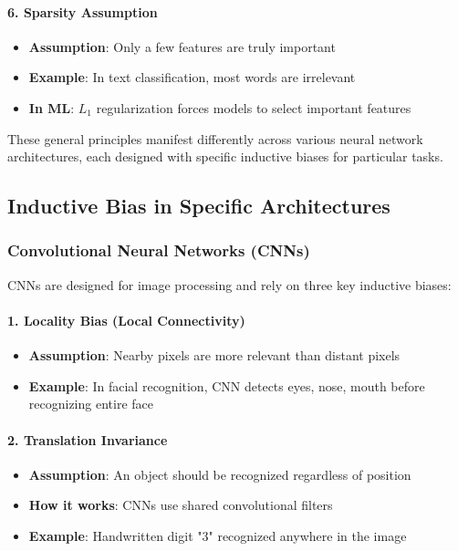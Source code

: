 \paragraph{6. Sparsity Assumption}

\begin{itemize}
\item \textbf{Assumption}: Only a few features are truly important
\item \textbf{Example}: In text classification, most words are irrelevant
\item \textbf{In ML}: $L_1$ regularization forces models to select important features
\end{itemize}

These general principles manifest differently across various neural network architectures, each designed with specific inductive biases for particular tasks.

\subsection{Inductive Bias in Specific Architectures}

\subsubsection{Convolutional Neural Networks (CNNs)}

CNNs are designed for image processing and rely on three key inductive biases:

\paragraph{1. Locality Bias (Local Connectivity)}

\begin{itemize}
\item \textbf{Assumption}: Nearby pixels are more relevant than distant pixels
\item \textbf{Example}: In facial recognition, CNN detects eyes, nose, mouth before recognizing entire face
\end{itemize}

\paragraph{2. Translation Invariance}

\begin{itemize}
\item \textbf{Assumption}: An object should be recognized regardless of position
\item \textbf{How it works}: CNNs use shared convolutional filters
\item \textbf{Example}: Handwritten digit "3" recognized anywhere in the image
\end{itemize}

